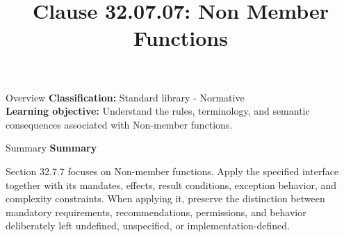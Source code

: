 \documentclass[10pt,letterpaper]{article}
\title{Clause 32.07.07: Non Member Functions}
\author{}
\date{}
\begin{document}
\maketitle
\begin{CornellOverviewBox}{Overview}
\textbf{Classification:} Standard library - Normative\\[2pt]
\textbf{Learning objective:} Understand the rules, terminology, and semantic consequences associated with Non-member functions.
\end{CornellOverviewBox}\begin{CornellSummaryBox}{Summary}
{\sffamily\bfseries\color{Accent} Summary}\par\vspace{3pt}Section 32.7.7 focuses on Non-member functions. Apply the specified interface together with its mandates, effects, result conditions, exception behavior, and complexity constraints. When applying it, preserve the distinction between mandatory requirements, recommendations, permissions, and behavior deliberately left undefined, unspecified, or implementation-defined.
\end{CornellSummaryBox}
\end{document}
